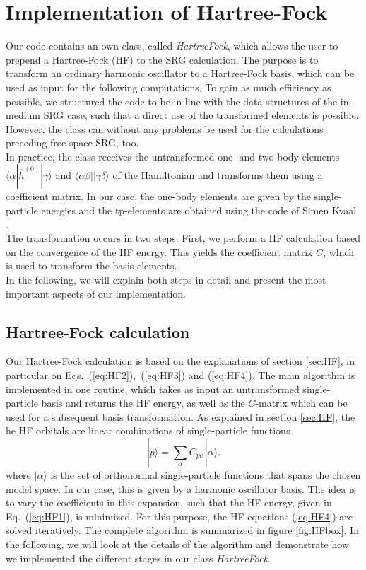 \section{Implementation of Hartree-Fock}
\label{sec:ImplHF}
Our code contains an own class, called \textit{HartreeFock}, which allows the user to prepend a \mbox{Hartree-Fock} (HF) to the SRG calculation. The purpose is to transform an ordinary harmonic oscillator to a Hartree-Fock basis, which can be used as input for the following computations. To gain as much efficiency as possible, we structured the code to be in line with the data structures of the in-medium SRG case, such that a direct use of the transformed elements is possible. However, the class can without any problems be used for the calculations preceding free-space SRG, too.\\
In practice, the class receives the untransformed one- and two-body elements $\langle \alpha |\hat{h}^{(0)}| \gamma\rangle$ and $\langle \alpha \beta ||\gamma\delta\rangle$ of the Hamiltonian and transforms them using a coefficient matrix. In our case, the one-body elements are given by the single-particle energies and the tp-elements are obtained using the code of Simen Kvaal \cite{Kvaalcode}.\\
The transformation occurs in two steps: First, we perform a HF calculation based on the convergence of the HF energy. This yields the coefficient matrix $C$, which is used to transform the basis elements. \\
In the following, we will explain both steps in detail and present the most important aspects of our implementation.

\subsection{Hartree-Fock calculation}
Our Hartree-Fock calculation is based on the explanations of section \ref{sec:HF}, in particular on \mbox{Eqs. (\ref{eq:HF2}), (\ref{eq:HF3})} and (\ref{eq:HF4}). The main algorithm is implemented in one routine, which takes as input an untransformed single-particle basis and returns the HF energy, as well as the $C$-matrix which can be used for a subsequent basis transformation.
As explained in section \ref{sec:HF}, the
he HF orbitals are linear combinations of single-particle functions
\[ 
|p\rangle = \sum_{\alpha} C_{p\alpha} |\alpha\rangle.
\]
where $|\alpha\rangle$ is the set of orthonormal single-particle functions that spans the chosen model space. In our case, this is given by a harmonic oscillator basis. The idea is to vary the coefficients in this expansion, such that the HF energy, given in Eq.~(\ref{eq:HF1}), is minimized.  For this purpose, the HF equations (\ref{eq:HF4}) are solved iteratively. The complete algorithm is summarized in figure \ref{fig:HFbox}. In the following, we will look at the details of the algorithm and demonstrate how we implemented the different stages in our class \textit{HartreeFock}.

